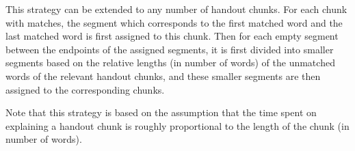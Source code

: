 This strategy can be extended to any number of handout chunks. For each chunk with matches, the segment which corresponds to the first matched word and the last matched word is first assigned to this chunk. Then for each empty segment between the endpoints of the assigned segments, it is first divided into smaller segments based on the relative lengths (in number of words) of the unmatched words of the relevant handout chunks, and these smaller segments are then assigned to the corresponding chunks.

Note that this strategy is based on the assumption that the time spent on explaining a handout chunk is roughly proportional to the length of the chunk (in number of words).

